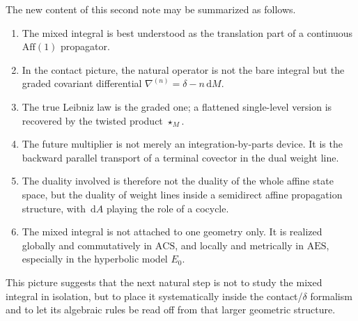 \documentclass[11pt]{article}
\newcommand{\dd}{\,\mathrm{d}}
\newcommand{\ACS}{\mathrm{ACS}}
\newcommand{\AES}{\mathrm{AES}}
\newcommand{\Aff}{\mathrm{Aff}}
\newcommand{\del}{\delta}
\newcommand{\nab}{\nabla}
\begin{document}
The new content of this second note may be summarized as follows.
\begin{enumerate}[leftmargin=1.5em]
\item The mixed integral is best understood as the translation part of a continuous $\Aff(1)$ propagator.
\item In the contact picture, the natural operator is not the bare integral but the graded covariant differential $\nab^{(n)}=\del-n\dd M$.
\item The true Leibniz law is the graded one; a flattened single-level version is recovered by the twisted product $\star_M$.
\item The future multiplier is not merely an integration-by-parts device. It is the backward parallel transport of a terminal covector in the dual weight line.
\item The duality involved is therefore not the duality of the whole affine state space, but the duality of weight lines inside a semidirect affine propagation structure, with $\dd A$ playing the role of a cocycle.
\item The mixed integral is not attached to one geometry only. It is realized globally and commutatively in $\ACS$, and locally and metrically in $\AES$, especially in the hyperbolic model $E_0$.
\end{enumerate}

This picture suggests that the next natural step is not to study the mixed integral in isolation, but to place it systematically inside the contact/$\delta$ formalism and to let its algebraic rules be read off from that larger geometric structure.
\end{document}
